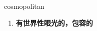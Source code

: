 
\begin{frame}
{\huge cosmopolitan}
\begin{center}
\begin{enumerate}\Large
  \item \textbf{有世界性眼光的，包容的}
\end{enumerate}
\end{center}
\end{frame}
